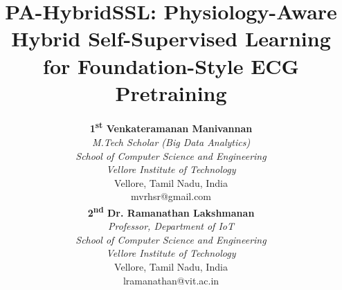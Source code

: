 \documentclass[journal,10pt]{IEEEtran}
\begin{document}

\title{PA-HybridSSL: Physiology-Aware Hybrid Self-Supervised Learning\\for Foundation-Style ECG Pretraining}

\author{
\begin{minipage}[t]{0.45\textwidth}\centering
\textbf{1\textsuperscript{st} Venkateramanan Manivannan}\\
\textit{M.Tech Scholar (Big Data Analytics)}\vspace{0.2em}\\
\textit{School of Computer Science and Engineering}\\
\textit{Vellore Institute of Technology}\\
Vellore, Tamil Nadu, India\\
mvrhsr@gmail.com
\end{minipage}
\hfill
\begin{minipage}[t]{0.45\textwidth}\centering
\textbf{2\textsuperscript{nd} Dr. Ramanathan Lakshmanan}\\
\textit{Professor, Department of IoT}\vspace{0.2em}\\
\textit{School of Computer Science and Engineering}\\
\textit{Vellore Institute of Technology}\\
Vellore, Tamil Nadu, India\\
lramanathan@vit.ac.in
\end{minipage}
}

\maketitle

\end{document}
